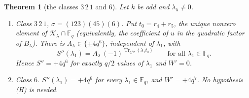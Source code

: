 \documentclass[12pt,a4paper]{amsart}
\newtheorem{theorem}{Theorem}[section]
\theoremstyle{definition}
\newcommand{\F}{\mathbb{F}}
\newcommand{\Tr}{\operatorname{Tr}}
\newcommand{\Kk}{\mathcal{K}}
\newcommand{\Spp}{S''}
\begin{document}
\begin{theorem}[the classes $3\,2\,1$ and $6$]\label{thm:level6}
Let $k$ be odd and $\lambda_5\ne0$.
\begin{enumerate}[label=\textup{(\roman*)},leftmargin=2em]
\item Class $3\,2\,1$, $\sigma=(123)(45)(6)$. Put $t_0=r_4+r_5$, the unique nonzero element of $\Kk_\lambda\cap\F_q$ \textup{(}equivalently, the coefficient of $u$ in the quadratic factor of $B_\lambda$\textup{)}. There is $A_\lambda\in\{\pm4q^6\}$, independent of $\lambda_1$, with
\[
\Spp(\lambda_1)=A_\lambda\,(-1)^{\Tr_{q/2}(\lambda_1t_0)}\qquad\text{for all }\lambda_1\in\F_q .
\]
Hence $\Spp=+4q^6$ for exactly $q/2$ values of $\lambda_1$ and $W'=0$.
\item Class $6$. $\Spp(\lambda_1)=+4q^6$ for every $\lambda_1\in\F_q$, and $W'=+4q^7$. No hypothesis \textup{(H)} is needed.
\end{enumerate}
\end{theorem}
\end{document}
